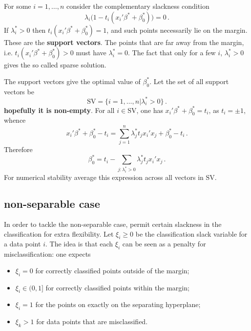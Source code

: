 \documentclass[a4paper]{article}
\begin{document}
For some $i=1,\ldots, n$ consider the complementary slackness condition
\[ \lambda_i \bigl( 1 - t_i ( x_i'\beta^* + \beta^*_0 ) \bigr) = 0 \,. \]
If $\lambda^*_i > 0 $ then $t_i ( x_i'\beta^* + \beta^*_0) = 1$, and such points
necessarily lie on the margin. These are the \textbf{support vectors}. The points
that are far away from the margin, i.e. $t_i ( x_i'\beta^* + \beta^*_0) > 0$ must
have $\lambda^*_i = 0$. The fact that only for a few $i$, $\lambda^*_i>0$ gives
the so called sparse solution.

The support vectors give the optimal value of $\beta^*_0$. Let the set of all support
vectors be
\[ \text{SV} = \{i=1,\ldots,n| \lambda^*_i>0\} \,. \]
\textbf{hopefully it is non-empty}. For all $i\in \text{SV}$, one has
$x_i'\beta^* + \beta^*_0 = t_i $, as $t_i = \pm 1$, whence
\[ 
x_i'\beta^* + \beta^*_0 - t_i 
= \sum_{j=1}^n \lambda^*_j t_j x_i'x_j + \beta^*_0 - t_i \,.
\]
Therefore
\[ \beta^*_0 = t_i - \sum_{j:\lambda^*_i>0} \lambda^*_j t_j x_i'x_j \,. \]
For numerical stability average this expression across all vectors in $\text{SV}$.

\subsection*{non-separable case} %
\label{sub:non_separable_case}

In order to tackle the non-separable case, permit certain slackness in the classification
for extra flexibility. Let $\xi_i \geq 0$ be the classification slack variable for a data
point $i$. The idea is that each $\xi_i$ can be seen as a penalty for misclassification:
one expects \begin{itemize}
	\item $\xi_i = 0$ for correctly classified points outside of the margin;
	\item $\xi_i\in(0,1]$ for correctly classified points within the margin;
	\item $\xi_i = 1$ for the points on exactly on the separating hyperplane;
	\item $\xi_k > 1$ for data points that are misclassified.
\end{itemize}
\end{document}
